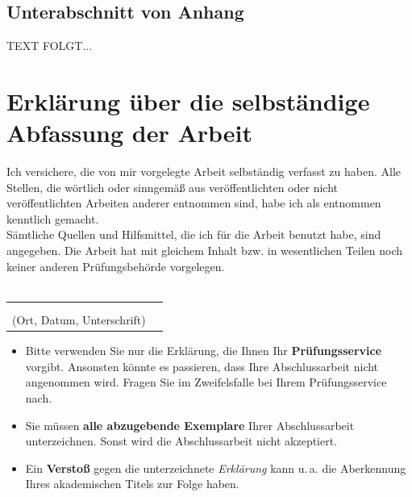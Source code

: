 \documentclass[a4paper,12pt,oneside]{article}
\begin{document}
    \subsection{Unterabschnitt von Anhang}\label{subsec_UabsAnhang}
    TEXT FOLGT...
  
  \newpage
  
 \pagestyle{empty}
 \section*{Erklärung über die selbständige\\Abfassung der Arbeit} %
 Ich versichere, die von mir vorgelegte Arbeit selbständig verfasst zu haben.
 Alle Stellen, die wörtlich oder sinngemäß aus veröffentlichten oder nicht veröffentlichten Arbeiten anderer entnommen sind,
 habe ich als entnommen kenntlich gemacht.\\ 
 Sämtliche Quellen und Hilfsmittel, die ich für die Arbeit benutzt habe, sind
 angegeben. Die Arbeit hat mit gleichem Inhalt bzw. in wesentlichen Teilen noch keiner anderen Prüfungsbehörde vorgelegen.\\\\
\begin{tabular}{cp{7cm}}
    & \\ 
    & \\ \hline
  \small (Ort, Datum, Unterschrift) & \normalsize \\
  \end{tabular}
  
    \vspace{1cm}
 \begin{tcolorbox}[title={Hinweise zur obigen \textit{Erklärung}}]
\begin{itemize}
\item Bitte verwenden Sie nur die Erklärung, die Ihnen Ihr \textbf{Prüfungsservice} vorgibt. Ansonsten könnte es passieren, dass Ihre Abschlussarbeit nicht angenommen wird. Fragen Sie im Zweifelsfalle bei Ihrem Prüfungsservice nach.
\item Sie müssen \textbf{alle abzugebende Exemplare} Ihrer Abschlussarbeit unterzeichnen. Sonst wird die Abschlussarbeit nicht akzeptiert. 
\item Ein \textbf{Verstoß} gegen die unterzeichnete \textit{Erklärung} kann u.\,a. die Aberkennung Ihres akademischen Titels zur Folge haben.
\end{itemize}  
  \end{tcolorbox}
   
\newpage
\thispagestyle{empty}

    
\end{document}
